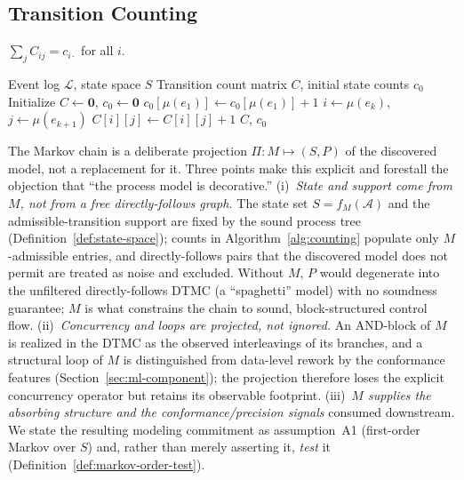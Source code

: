 \subsection{Transition Counting}
\label{sec:s3-counting}

\begin{property}
\label{prop:count-consistency}
$\sum_j C_{ij} = c_{i \cdot}$ for all $i$.
\end{property}

\begin{algorithm}[htbp]
\caption{Transition Count Extraction}
\label{alg:counting}
\begin{algorithmic}[1]
\REQUIRE Event log $\mathcal{L}$, state space $S$
\ENSURE Transition count matrix $C$, initial state counts $c_0$
\STATE Initialize $C \gets \mathbf{0}$, $c_0 \gets \mathbf{0}$
    \STATE $c_0[\mu(e_1)] \gets c_0[\mu(e_1)] + 1$
        \STATE $i \gets \mu(e_k)$, $j \gets \mu(e_{k+1})$
        \STATE $C[i][j] \gets C[i][j] + 1$
    \ENDFOR
\ENDFOR
\RETURN $C$, $c_0$
\end{algorithmic}
\end{algorithm}

\begin{remark}
\label{rem:projection}
The Markov chain is a deliberate projection $\Pi: M \mapsto (S, P)$ of the
discovered model, not a replacement for it. Three points make this explicit
and forestall the objection that ``the process model is decorative.''
(i)~\emph{State and support come from $M$, not from a free directly-follows
graph.} The state set $S = f_M(\mathcal{A})$ and the admissible-transition
support are fixed by the sound process tree (Definition~\ref{def:state-space});
counts in Algorithm~\ref{alg:counting} populate only $M$-admissible entries,
and directly-follows pairs that the discovered model does not permit are
treated as noise and excluded. Without $M$, $P$ would degenerate into the
unfiltered directly-follows DTMC (a ``spaghetti'' model) with no soundness
guarantee; $M$ is what constrains the chain to sound, block-structured
control flow. (ii)~\emph{Concurrency and loops are projected, not ignored.}
An AND-block of $M$ is realized in the DTMC as the observed interleavings of
its branches, and a structural loop of $M$ is distinguished from data-level
rework by the conformance features (Section~\ref{sec:ml-component}); the
projection therefore loses the explicit concurrency operator but retains its
observable footprint. (iii)~\emph{$M$ supplies the absorbing structure and
the conformance/precision signals} consumed downstream. We state the
resulting modeling commitment as assumption~A1 (first-order Markov over
$S$) and, rather than merely asserting it, \emph{test} it
(Definition~\ref{def:markov-order-test}).
\end{remark}

